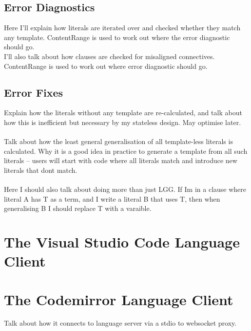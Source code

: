 \documentclass[../main.tex]{subfiles}
\begin{document}
\subsection{Error Diagnostics}
Here I'll explain how literals are iterated over and checked whether they match any template. ContentRange is used to work out where the error diagnostic should go.  \\ 
I'll also talk about how clauses are checked for misaligned connectives. ContentRange is used to work out where error diagnostic should go.

\subsection{Error Fixes}
Explain how the literals without any template are re-calculated, and talk about how this is inefficient but necessary by my stateless design. May optimise later. 
\\ 
\\ 
Talk about how the least general generalisation of all template-less literals is calculated. Why it is a good idea in practice to generate a template from all such literals -- users will start with code where all literals match and introduce new literals that dont match. 
\\ 
\\ 
Here I should also talk about doing more than just LGG. If Im in a clause where literal A has T as a term, and I write a literal B that uses T, then when generalising B I should replace T with a varaible.


\section{The Visual Studio Code Language Client}

\section{The Codemirror Language Client}
Talk about how it connects to language server via a stdio to websocket proxy.
\end{document}
